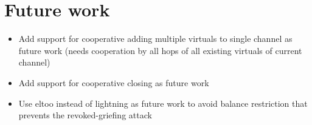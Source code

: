 \section{Future work}
  \begin{itemize}
    \item Add support for cooperative adding multiple virtuals to single channel
    as future work (needs cooperation by all hops of all existing virtuals of
    current channel)
    \item Add support for cooperative closing as future work
    \item Use eltoo instead of lightning as future work to avoid balance
    restriction that prevents the revoked-griefing attack
  \end{itemize}
